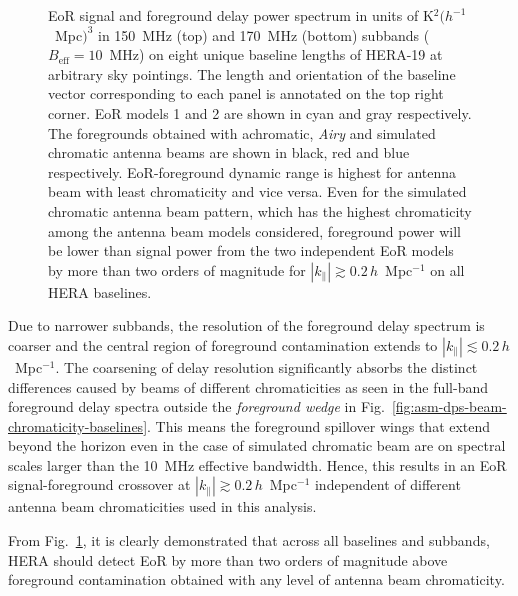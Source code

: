 \documentclass[preprint2,iop,numberedappendix,twocolappendix,appendixfloats]{emulateapj}
\begin{document}
\begin{figure}[htb]
  \caption{EoR signal and foreground delay power spectrum in units of K$^2 (h^{-1}$~Mpc$)^3$ in 150~MHz (top) and 170~MHz (bottom) subbands ($B_\textrm{eff}=10$~MHz) on eight unique baseline lengths of HERA-19 at arbitrary sky pointings. The length and orientation of the baseline vector corresponding to each panel is annotated on the top right corner. EoR models 1 and 2 are shown in cyan and gray respectively. The foregrounds obtained with achromatic, {\it Airy} and simulated chromatic antenna beams are shown in black, red and blue respectively. EoR-foreground dynamic range is highest for antenna beam with least chromaticity and vice versa. Even for the simulated chromatic antenna beam pattern, which has the highest chromaticity among the antenna beam models considered, foreground power will be lower than signal power from the two independent EoR models by more than two orders of magnitude for $|k_\parallel| \gtrsim 0.2\,h$~Mpc$^{-1}$ on all HERA baselines.}
  \label{fig:subbands}
\end{figure}

Due to narrower subbands, the resolution of the foreground delay spectrum is coarser and the central region of foreground contamination extends to $|k_\parallel| \lesssim 0.2\,h$~Mpc$^{-1}$. The coarsening of delay resolution significantly absorbs the distinct differences caused by beams of different chromaticities as seen in the full-band foreground delay spectra outside the {\it foreground wedge} in Fig.~\ref{fig:asm-dps-beam-chromaticity-baselines}. This means the foreground spillover wings that extend beyond the horizon even in the case of simulated chromatic beam are on spectral scales larger than the 10~MHz effective bandwidth. Hence, this results in an EoR signal-foreground crossover at $|k_\parallel| \gtrsim 0.2\,h$~Mpc$^{-1}$ independent of different antenna beam chromaticities used in this analysis. 

From Fig.~\ref{fig:subbands}, it is clearly demonstrated that across all baselines and subbands, HERA should detect EoR by more than two orders of magnitude above foreground contamination obtained with any level of antenna beam chromaticity. %
\end{document}
